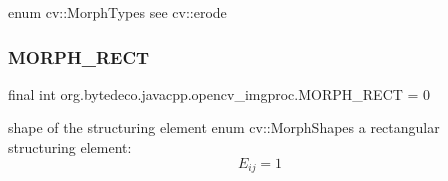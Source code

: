 enum cv\+::\+Morph\+Types see cv\+::erode \mbox{\label{group__imgproc__filter_ga8380bc8d565b30f65b81f16987e9edeb}} 
\subsubsection{\texorpdfstring{M\+O\+R\+P\+H\+\_\+\+R\+E\+CT}{MORPH\_RECT}}
{\footnotesize\ttfamily final int org.\+bytedeco.\+javacpp.\+opencv\+\_\+imgproc.\+M\+O\+R\+P\+H\+\_\+\+R\+E\+CT = 0\hspace{0.3cm}{\ttfamily [static]}}

shape of the structuring element enum cv\+::\+Morph\+Shapes a rectangular structuring element\+: \[E_{ij}=1\] 